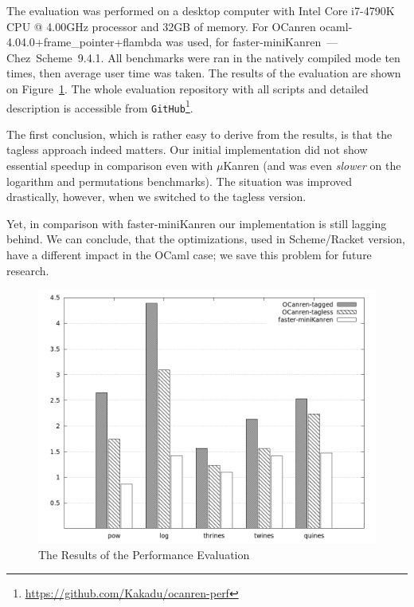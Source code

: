 The evaluation was performed on a desktop computer with Intel Core i7-4790K CPU @ 4.00GHz processor and 32GB of memory.
For OCanren \mbox{ocaml-4.04.0+frame_pointer+flambda} was used, for faster-miniKanren~--- Chez~Scheme~9.4.1.
All benchmarks were ran in the natively compiled mode ten times, then average user time was taken. The results of the evaluation
are shown on Figure~\ref{eval}. The whole evaluation repository with all scripts and detailed description is accessible 
from \lstinline{GitHub}\footnote{\url{https://github.com/Kakadu/ocanren-perf}}.

The first conclusion, which is rather easy to derive from the results, is that the tagless approach indeed matters. Our initial
implementation did not show essential speedup in comparison even with $\mu$Kanren (and was even \emph{slower} on the logarithm
and permutations benchmarks). The situation was improved drastically, however, when we switched to the tagless version.

Yet, in comparison with faster-miniKanren our implementation is still lagging behind. We can conclude, that the optimizations, 
used in Scheme/Racket version, have a different impact in the OCaml case; we save this problem for future research.

\begin{figure}[t]
\centering
\includegraphics[scale=0.4]{graph.png}
\caption{The Results of the Performance Evaluation}
\label{eval}
\end{figure}
